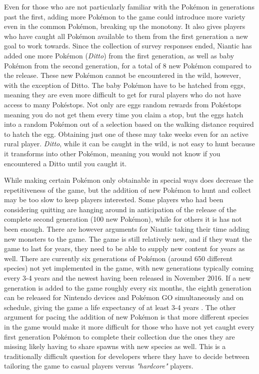 Even for those who are not particularly familiar with the Pokémon in generations past the first, adding more Pokémon to the game could introduce more variety even in the common Pokémon, breaking up the monotony. It also gives players who have caught all Pokémon available to them from the first generation a new goal to work towards. Since the collection of survey responses ended, Niantic has added one more Pokémon (\emph{Ditto}) from the first generation, as well as baby Pokémon from the second generation, for a total of 8 new Pokémon compared to the release. These new Pokémon cannot be encountered in the wild, however, with the exception of Ditto. The baby Pokémon have to be hatched from eggs, meaning they are even more difficult to get for rural players who do not have access to many Pokéstops. Not only are eggs random rewards from Pokéstops meaning you do not get them every time you claim a stop, but the eggs hatch into a random Pokémon out of a selection based on the walking distance required to hatch the egg. Obtaining just one of these may take weeks even for an active rural player. \emph{Ditto}, while it can be caught in the wild, is not easy to hunt because it transforms into other Pokémon, meaning you would not know if you encountered a Ditto until you caught it.

While making certain Pokémon only obtainable in special ways does decrease the repetitiveness of the game, but the addition of new Pokémon to hunt and collect may be too slow to keep players interested. Some players who had been considering quitting are hanging around in anticipation of the release of the complete second generation (100 new Pokémon), while for others it is has not been enough. There are however arguments for Niantic taking their time adding new monsters to the game. The game is still relatively new, and if they want the game to last for years, they need to be able to supply new content for years as well. There are currently six generations of Pokémon (around 650 different species) not yet implemented in the game, with new generations typically coming every 3-4 years and the newest having been released in November 2016. If a new generation is added to the game roughly every six months, the eighth generation can be released for Nintendo devices and Pokémon GO simultaneously and on schedule, giving the game a life expectancy of at least 3-4 years . The other argument for pacing the addition of new Pokémon is that more different species in the game would make it more difficult for those who have not yet caught every first generation Pokémon to complete their collection due the ones they are missing likely having to share spawns with new species as well. This is a traditionally difficult question for developers where they have to decide between tailoring the game to casual players versus \emph{"hardcore"} players.

